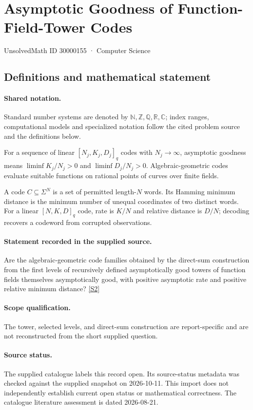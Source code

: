 \documentclass[11pt]{article}
\newcommand{\sref}[2]{\hyperlink{source:#1:#2}{[S#2]}}
\begin{document}
\setcounter{section}{30000154}
\section{Asymptotic Goodness of Function-Field-Tower Codes}\label{30000155}
{\small\sffamily UnsolvedMath ID 30000155 · Computer Science}
\subsection{Definitions and mathematical statement}

\paragraph{Shared notation.}Standard number systems are denoted by $\mathbb N,\mathbb Z,\mathbb Q,\mathbb R,\mathbb C$; index ranges, computational models and specialized notation follow the cited problem source and the definitions below.


For a sequence of linear $[N_j,K_j,D_j]_q$ codes with $N_j\to\infty$, asymptotic goodness means $\liminf K_j/N_j>0$ and $\liminf D_j/N_j>0$. Algebraic-geometric codes evaluate suitable functions on rational points of curves over finite fields.

A code $C\subseteq\Sigma^N$ is a set of permitted length-$N$ words. Its Hamming minimum distance is the minimum number of unequal coordinates of two distinct words. For a linear $[N,K,D]_q$ code, rate is $K/N$ and relative distance is $D/N$; decoding recovers a codeword from corrupted observations.
\paragraph{Statement recorded in the supplied source.}
Are the algebraic-geometric code families obtained by the direct-sum construction from the first levels of recursively defined asymptotically good towers of function fields themselves asymptotically good, with positive asymptotic rate and positive relative minimum distance? \sref{30000155}{2}
\paragraph{Scope qualification.}
The tower, selected levels, and direct-sum construction are report-specific and are not reconstructed from the short supplied question.
\paragraph{Source status.}
The supplied catalogue labels this record open. Its source-status metadata was checked against the supplied snapshot on 2026-10-11. This import does not independently establish current open status or mathematical correctness. The catalogue literature assessment is dated 2026-08-21.
\end{document}
